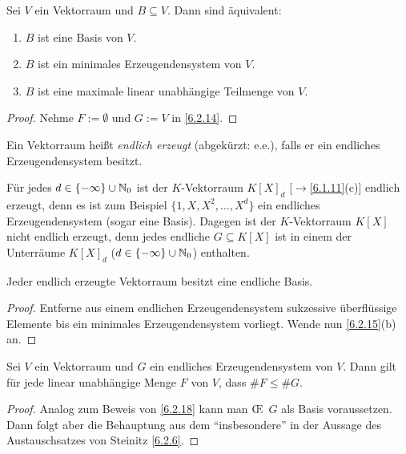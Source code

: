 \documentclass[../../main.tex]{subfiles}
\begin{document}
\begin{kor}\label{6.2.15}
Sei $V$ ein Vektorraum und $B\subseteq V$.
Dann sind äquivalent:
\begin{enumerate}[\rm(a)]
\item $B$ ist eine Basis von $V$.
\item $B$ ist ein minimales Erzeugendensystem von $V$.
\item $B$ ist eine maximale linear unabhängige Teilmenge von $V$.
\end{enumerate}
\end{kor}
\begin{proof}
Nehme $F:=\emptyset$ und $G:=V$ in \ref{6.2.14}.
\end{proof}

\begin{df}\label{6.2.16}
Ein Vektorraum heißt \emph{endlich erzeugt} (abgekürzt: e.e.), falls er ein endliches Erzeugendensystem besitzt.
\end{df}

\begin{bsp}\label{6.2.17}
Für jedes $d\in\{-\infty\}\cup\mathbb N_0$ ist der $K$-Vektorraum $K[X]_d$ [$\to$\ref{6.1.11}(c)] endlich erzeugt, denn es ist zum Beispiel $\{1,X,X^2,\dots,X^d\}$ ein endliches Erzeugendensystem (sogar eine Basis). Dagegen ist der $K$-Vektorraum $K[X]$ nicht endlich erzeugt, denn jedes endliche $G\subseteq K[X]$ ist in einem der Unterräume
$K[X]_d$ ($d\in\{-\infty\}\cup\mathbb N_0$) enthalten.
\end{bsp}

\begin{kor}\label{6.2.18}
Jeder endlich erzeugte Vektorraum besitzt eine endliche Basis.
\end{kor}
\begin{proof}
Entferne aus einem endlichen Erzeugendensystem sukzessive überflüssige Elemente bis ein minimales Erzeugendensystem vorliegt. Wende nun \ref{6.2.15}(b) an.
\end{proof}

\begin{sat}\label{6.2.19}
Sei $V$ ein Vektorraum und $G$ ein endliches Erzeugendensystem von $V$. Dann gilt für jede linear unabhängige Menge $F$ von $V$, dass $\#F\le\#G$.
\end{sat}
\begin{proof}
Analog zum Beweis von \ref{6.2.18} kann man \OE\ $G$ als Basis voraussetzen. Dann folgt aber die Behauptung aus dem "`insbesondere"' in der Aussage des
Austauschsatzes von Steinitz \ref{6.2.6}.
\end{proof}
\end{document}
